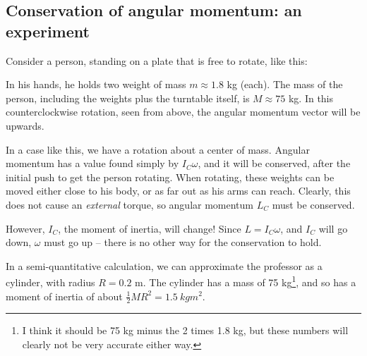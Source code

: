 \subsection{Conservation of angular momentum: an experiment}

Consider a person, standing on a plate that is free to rotate, like this:

\begin{figure}[H]
  \centering
{}
\end{figure}


In his hands, he holds two weight of mass $m \approx 1.8$ kg (each). The mass of the person, including the weights plus the turntable itself, is $M \approx 75$ kg.
In this counterclockwise rotation, seen from above, the angular momentum vector will be upwards.

In a case like this, we have a rotation about a center of mass. Angular momentum has a value found simply by $I_C \omega$, and it will be conserved, after the initial push to get the person rotating. When rotating, these weights can be moved either close to his body, or as far out as his arms can reach. Clearly, this does not cause an \emph{external} torque, so angular momentum $L_C$ must be conserved.

However, $I_C$, the moment of inertia, will change! Since $L = I_C \omega$, and $I_C$ will go down, $\omega$ must go up -- there is no other way for the conservation to hold.

In a semi-quantitative calculation, we can approximate the professor as a cylinder, with radius $R = 0.2$ m. The cylinder has a mass of 75 kg\footnote{I think it should be 75 kg minus the 2 times 1.8 kg, but these numbers will clearly not be very accurate either way.}, and so has a moment of inertia of about $\frac{1}{2} M R^2 = \SI{1.5}{kg m^2}$.


